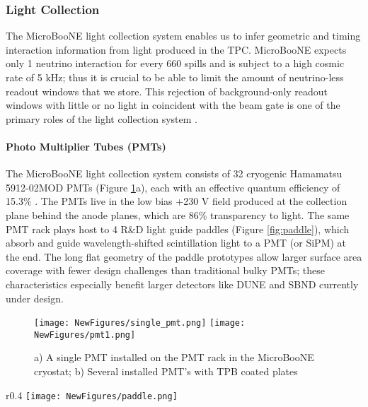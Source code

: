 \documentclass[12pt]{article}
\begin{document}
\subsubsection{Light Collection} \label{subsec:lightCollection}
\par The MicroBooNE light collection system enables us to infer geometric and timing interaction information from light produced in the TPC. MicroBooNE expects only 1 neutrino interaction for every 660 spills \cite{bib:first_nus} and is subject to a high cosmic rate of 5 kHz; thus it is crucial to be able to limit the amount of neutrino-less readout windows that we store. This rejection of background-only readout windows with little or no light in coincident with the beam gate is one of the primary roles of the light collection system \cite{bib:uboone_JINST}.

\paragraph{Photo Multiplier Tubes (PMTs)}

\par The MicroBooNE light collection system consists of 32 cryogenic Hamamatsu 5912-02MOD PMTs (Figure \ref{fig:pmt}a), each with an effective quantum efficiency of 15.3\% \cite{bib:ben_jones}. The PMTs live in the low bias +230 V field produced at the collection plane behind the anode planes, which are 86\% transparency to light.  The same PMT rack plays host to 4 R\&D light guide paddles (Figure \ref{fig:paddle}), which absorb and guide wavelength-shifted scintillation light to a PMT (or SiPM) at the end. The long flat geometry of the paddle prototypes allow larger surface area coverage with fewer design challenges than traditional bulky PMTs; these characteristics especially benefit larger detectors like DUNE and SBND currently under design.  

\begin{figure}[h!]
\centering
\texttt{[image: NewFigures/single\_pmt.png]}
\hspace{3 mm}
\texttt{[image: NewFigures/pmt1.png]}
\caption{ a) A single PMT installed on the PMT rack in the MicroBooNE cryostat; b) Several installed PMT's with TPB coated plates  } 
\label{fig:pmt}
\end{figure}

\begin{wrapfigure}{r}{0.4\textwidth}
\centering
\texttt{[image: NewFigures/paddle.png]}
\caption{One of the 4 lightguide prototypes in the MicroBooNE PMT rack}
\label{fig:paddle}
\end{wrapfigure}
\end{document}
